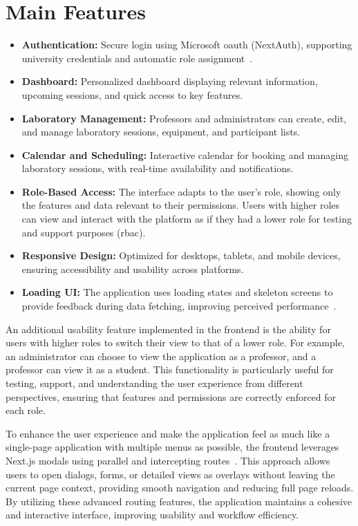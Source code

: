 \section{Main Features}
\begin{itemize}
    \item \textbf{Authentication:} Secure login using Microsoft \ac{oauth} (NextAuth), supporting university credentials and automatic role assignment~\cite{nextjs-authentication}.
    \item \textbf{Dashboard:} Personalized dashboard displaying relevant information, upcoming sessions, and quick access to key features.
    \item \textbf{Laboratory Management:} Professors and administrators can create, edit, and manage laboratory sessions, equipment, and participant lists.
    \item \textbf{Calendar and Scheduling:} Interactive calendar for booking and managing laboratory sessions, with real-time availability and notifications.
    \item \textbf{Role-Based Access:} The interface adapts to the user's role, showing only the features and data relevant to their permissions. Users with higher roles can view and interact with the platform as if they had a lower role for testing and support purposes (\ac{rbac}).
    \item \textbf{Responsive Design:} Optimized for desktops, tablets, and mobile devices, ensuring accessibility and usability across platforms.
    \item \textbf{Loading UI:} The application uses loading states and skeleton screens to provide feedback during data fetching, improving perceived performance~\cite{nextjs-loading-ui}.
\end{itemize}

An additional usability feature implemented in the frontend is the ability for users with higher roles to switch their view to that of a lower role. For example, an administrator can choose to view the application as a professor, and a professor can view it as a student. This functionality is particularly useful for testing, support, and understanding the user experience from different perspectives, ensuring that features and permissions are correctly enforced for each role.

To enhance the user experience and make the application feel as much like a single-page application with multiple menus as possible, the frontend leverages Next.js modals using parallel and intercepting routes~\cite{nextjs-app-router}. This approach allows users to open dialogs, forms, or detailed views as overlays without leaving the current page context, providing smooth navigation and reducing full page reloads. By utilizing these advanced routing features, the application maintains a cohesive and interactive interface, improving usability and workflow efficiency.

